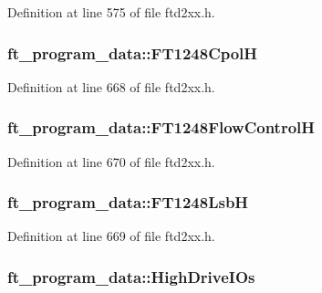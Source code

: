 Definition at line 575 of file ftd2xx.h.\hypertarget{structft__program__data_a60a9e8a5d36a0e3afcb3236f82a99b1d}{
\subsubsection[{FT1248CpolH}]{ {\bf ft\_\-program\_\-data::FT1248CpolH}}}
\label{structft__program__data_a60a9e8a5d36a0e3afcb3236f82a99b1d}


Definition at line 668 of file ftd2xx.h.\hypertarget{structft__program__data_accb9f60cb1450ffd7d942e95729188ed}{
\subsubsection[{FT1248FlowControlH}]{ {\bf ft\_\-program\_\-data::FT1248FlowControlH}}}
\label{structft__program__data_accb9f60cb1450ffd7d942e95729188ed}


Definition at line 670 of file ftd2xx.h.\hypertarget{structft__program__data_a4088d357bd88bee7c601fa525a9175ea}{
\subsubsection[{FT1248LsbH}]{ {\bf ft\_\-program\_\-data::FT1248LsbH}}}
\label{structft__program__data_a4088d357bd88bee7c601fa525a9175ea}


Definition at line 669 of file ftd2xx.h.\hypertarget{structft__program__data_a0f53600aee9f86d6286ecd0803f71825}{
\subsubsection[{HighDriveIOs}]{ {\bf ft\_\-program\_\-data::HighDriveIOs}}}
\label{structft__program__data_a0f53600aee9f86d6286ecd0803f71825}


